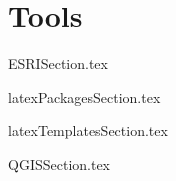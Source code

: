 \documentclass[class=report , crop=false, openany, titlepage, twoside, multi={itemize, figure, verbatim}, float=false]{standalone}
\title{}  %
\begin{document}
\ifstandalone
\maketitle %
\clearpage
\tableofcontents %
\clearpage
\fi

\chapter{Tools}
{ESRISection.tex}

{latexPackagesSection.tex}

{latexTemplatesSection.tex}

{QGISSection.tex}
\end{document}
